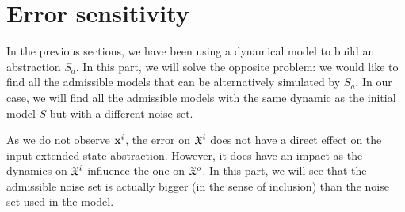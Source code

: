 \newcommand{\xo}{\vect{x}^o}%
\newcommand{\xr}{\vect{x}^r}%
%
\newcommand{\Ao}{A_o}%
\newcommand{\Ar}{A_r}%
\newcommand{\Aro}{A_{ro}}%
%
\newcommand{\Bo}{B_o}%
\newcommand{\Br}{B_r}%
%
\newcommand{\Eo}{E_o}%
\newcommand{\Er}{E_r}%
\newcommand{\Ero}{E_{ro}}%
%
\newcommand{\Xr}{X_r}%
%
\newcommand{\Xrinv}{\mathcal{X}_r}%
\newcommand{\xrinf}{\minf{\x}^r}%
\newcommand{\xrsup}{\msup{\x}^r}%
%
%
\newcommand{\Wsup}{\msup{W}}%
\newcommand{\Winf}{\minf{W}}%
\newcommand{\Wk}{W_k}%
%
\renewcommand{\wr}{\vect{w}^r}%
\newcommand{\wrsup}{\msup{\vect{w}}^r}%
\newcommand{\wrinf}{\minf{\vect{w}}^r}%
\newcommand{\Wrsup}{\msup{W}^r}%
\newcommand{\Wrinf}{\minf{W}^r}%
\newcommand{\Wrk}{W^r_k}%
%
\newcommand{\z}{\vect{z}}%
\newcommand{\zk}{\z_k}%
\newcommand{\zkn}{\z_{k+1}}%
%
\newcommand{\xkn}{\x_{k+1}}%
\newcommand{\xk}{\x_{k}}%
\newcommand{\xrk}{\xr_{k}}%
\newcommand{\uk}{\u_{k}}%
\newcommand{\wk}{\w_{k}}%
\newcommand{\yk}{\y_{k}}%
\newcommand{\ykn}{\y_{k+1}}%
%
\newcommand{\Z}{\mathbf{z}}%
\newcommand{\Zk}{\Z_k}%
\newcommand{\Zkn}{\Z_{k+1}}%
\newcommand{\hk}{\vect{h}_{k}}%
\newcommand{\h}{\vect{h}}%
\newcommand{\wnoise}{\msup{\sigma}}%
%
\newcommand{\size}{N}%
\newcommand{\norminf}[1]{\left\|#1\right\|_{\infty}}%
%
\newcommand{\xui}{\minf{\x}^U_r}%
\newcommand{\xus}{\msup{\x}^U_r}%
\newcommand{\An}{\mathcal{A}^r_n}%
\newcommand{\Bn}{\mathcal{B}^r_n}%
\newcommand{\En}{\mathcal{E}^r_n}%
\newcommand{\xuki}{\minf{\x}^{U_k}_r}%
\newcommand{\xuks}{\msup{\x}^{U_k}_r}%
\newcommand{\xuk}{\x^{U_k}_r}%
%
\newcommand{\ANoise}{\Omega}%
\newcommand{\NoiseSet}{\mathcal{W}}%
\newcommand{\infseq}{\omega}%
%
\newcommand{\sykn}{\msup{\y}_{k+1}}%
\newcommand{\iykn}{\minf{\y}_{k+1}}%
%
\newcommand{\filter}{\mathcal{F}}%
%
\section{Error sensitivity}
%
In the previous sections, we have been using a dynamical model to build an abstraction $S_a$. In this part, we will solve the opposite problem:  we would like to find all the admissible models that can be alternatively simulated by $S_a$.
In our case, we will find all the admissible models with the same dynamic as the initial model $S$ but with a different noise set.

As we do not observe $ \mathbf{x}^i$, the error on $\mathfrak{X}^i$ does not have a direct effect on the input extended state abstraction.
However, it does have an impact as the dynamics on $\mathfrak{X}^i$ influence the one on $\mathfrak{X}^o$.
In this part, we will see that the admissible noise set is actually bigger (in the sense of inclusion) than the noise set used in the model.


